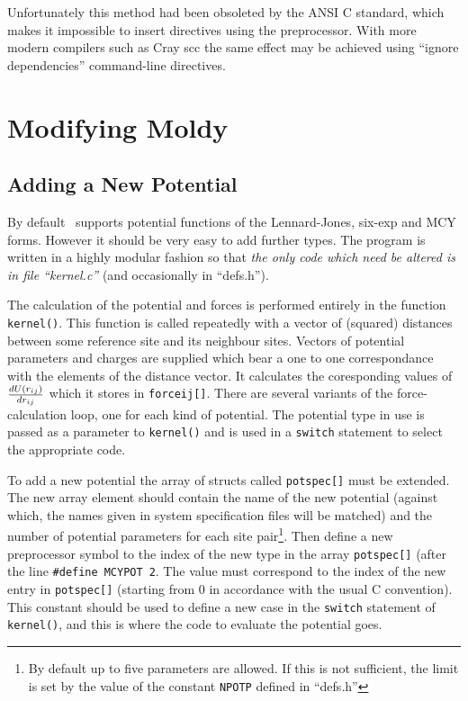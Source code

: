 Unfortunately this method had been obsoleted by the ANSI C standard,
which makes it impossible to insert directives using the preprocessor.
With more modern compilers such as Cray scc the same effect may be
achieved using ``ignore dependencies'' command-line directives.

\section{Modifying Moldy}
\subsection{Adding a New Potential}
\label{sec:newpot}
By default \moldy\  supports potential functions of the Lennard-Jones,
six-exp and MCY forms.  However it should be very easy to add further
types. The program is written in a highly modular fashion so that {\em
the only code which need be altered is in file ``kernel.c''} (and
occasionally in ``defs.h''). 

The calculation of the potential and forces is performed entirely in
the function \verb'kernel()'.  This function is called repeatedly with
a vector of (squared) distances between some reference site and its
neighbour sites.  Vectors of potential parameters and charges are
supplied which bear a one to one correspondance with the elements of
the distance vector.  It calculates the coresponding values of
${dU(r_{ij})} \over {dr_{ij}}$ which it stores in \verb'forceij[]'.
There are several variants of the force-calculation loop, one for each
kind of potential.  The potential type in use is passed as a parameter
to \verb'kernel()' and is used in a \verb'switch' statement to select
the appropriate code. 

To add a new potential the array of structs called \verb'potspec[]'
must be extended.  The new array element should contain the name of
the new potential (against which, the names given in system
specification files will be matched) and the number of potential
parameters for each site pair\footnote{By default up to five
parameters are allowed. If this is not sufficient, the limit is set by
the value of the constant \verb'NPOTP' defined in ``defs.h''}.  Then
define a new preprocessor symbol to the index of the new type in the
array \verb'potspec[]' (after the line
\verb'#define'~\verb'MCYPOT'~\verb'2'.  The value must correspond to
the index of the new entry in \verb'potspec[]' (starting from 0 in
accordance with the usual C convention).  This constant should be used
to define a new case in the \verb'switch' statement of
\verb'kernel()', and this is where the code to evaluate the potential goes.

